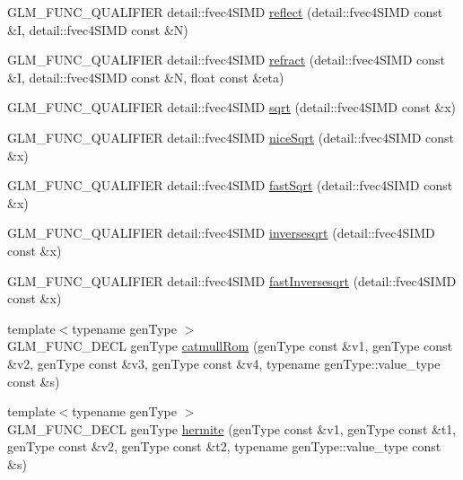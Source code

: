 \begin{DoxyCompactItemize}
\item 
G\+L\+M\+\_\+\+F\+U\+N\+C\+\_\+\+Q\+U\+A\+L\+I\+F\+I\+E\+R detail\+::fvec4\+S\+I\+M\+D \hyperlink{namespaceglm_aca05cfddf931415f023b4ac91b96d739}{reflect} (detail\+::fvec4\+S\+I\+M\+D const \&I, detail\+::fvec4\+S\+I\+M\+D const \&N)
\item 
G\+L\+M\+\_\+\+F\+U\+N\+C\+\_\+\+Q\+U\+A\+L\+I\+F\+I\+E\+R detail\+::fvec4\+S\+I\+M\+D \hyperlink{namespaceglm_a6b7db0c107279793b77576c2eef680b3}{refract} (detail\+::fvec4\+S\+I\+M\+D const \&I, detail\+::fvec4\+S\+I\+M\+D const \&N, float const \&eta)
\item 
G\+L\+M\+\_\+\+F\+U\+N\+C\+\_\+\+Q\+U\+A\+L\+I\+F\+I\+E\+R detail\+::fvec4\+S\+I\+M\+D \hyperlink{namespaceglm_a0af4fc25d7a64d4947598f48a0229375}{sqrt} (detail\+::fvec4\+S\+I\+M\+D const \&x)
\item 
G\+L\+M\+\_\+\+F\+U\+N\+C\+\_\+\+Q\+U\+A\+L\+I\+F\+I\+E\+R detail\+::fvec4\+S\+I\+M\+D \hyperlink{namespaceglm_a4b8b68e979fc5b12aba9290beb8dfb30}{nice\+Sqrt} (detail\+::fvec4\+S\+I\+M\+D const \&x)
\item 
G\+L\+M\+\_\+\+F\+U\+N\+C\+\_\+\+Q\+U\+A\+L\+I\+F\+I\+E\+R detail\+::fvec4\+S\+I\+M\+D \hyperlink{namespaceglm_a668307d251c9bc5a349ab3d2d83095d4}{fast\+Sqrt} (detail\+::fvec4\+S\+I\+M\+D const \&x)
\item 
G\+L\+M\+\_\+\+F\+U\+N\+C\+\_\+\+Q\+U\+A\+L\+I\+F\+I\+E\+R detail\+::fvec4\+S\+I\+M\+D \hyperlink{namespaceglm_ac3ad88ad132bb5179b928f3f57afc6b5}{inversesqrt} (detail\+::fvec4\+S\+I\+M\+D const \&x)
\item 
G\+L\+M\+\_\+\+F\+U\+N\+C\+\_\+\+Q\+U\+A\+L\+I\+F\+I\+E\+R detail\+::fvec4\+S\+I\+M\+D \hyperlink{namespaceglm_af499190525c6e1f524054b9b18b12444}{fast\+Inversesqrt} (detail\+::fvec4\+S\+I\+M\+D const \&x)
\item 
{\footnotesize template$<$typename gen\+Type $>$ }\\G\+L\+M\+\_\+\+F\+U\+N\+C\+\_\+\+D\+E\+C\+L gen\+Type \hyperlink{group__gtx__spline_ga8119c04f8210fd0d292757565cd6918d}{catmull\+Rom} (gen\+Type const \&v1, gen\+Type const \&v2, gen\+Type const \&v3, gen\+Type const \&v4, typename gen\+Type\+::value\+\_\+type const \&s)
\item 
{\footnotesize template$<$typename gen\+Type $>$ }\\G\+L\+M\+\_\+\+F\+U\+N\+C\+\_\+\+D\+E\+C\+L gen\+Type \hyperlink{group__gtx__spline_gaa69e143f6374d32f934a8edeaa50bac9}{hermite} (gen\+Type const \&v1, gen\+Type const \&t1, gen\+Type const \&v2, gen\+Type const \&t2, typename gen\+Type\+::value\+\_\+type const \&s)

\end{DoxyCompactItemize}
